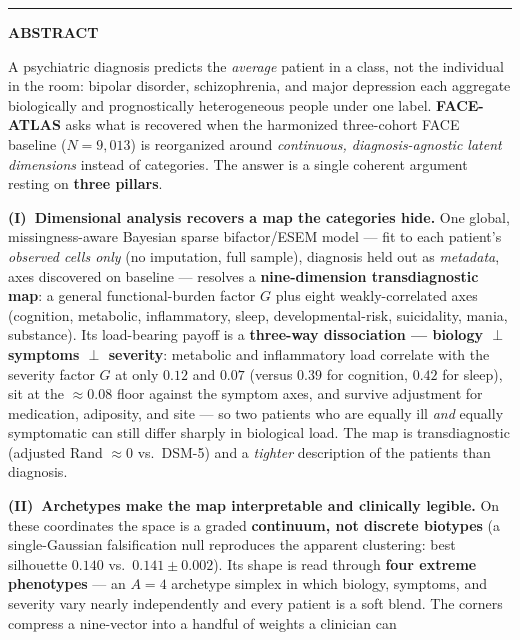 \documentclass[11pt]{article}
\begin{document}
\begin{titlepage}
{\color{facerule}\rule{\linewidth}{0.6pt}}\par\vspace{7pt}
{\sffamily\bfseries\color{faceaccent}\small ABSTRACT}\par\vspace{5pt}
{\small
A psychiatric diagnosis predicts the \emph{average} patient in a class, not the individual in the room: bipolar
disorder, schizophrenia, and major depression each aggregate biologically and prognostically heterogeneous
people under one label. \textbf{FACE-ATLAS} asks what is recovered when the harmonized three-cohort FACE
baseline ($N=9{,}013$) is reorganized around \emph{continuous, diagnosis-agnostic latent dimensions} instead of
categories. The answer is a single coherent argument resting on \textbf{three pillars}.\par\vspace{4pt}
\textbf{(I)~Dimensional analysis recovers a map the categories hide.} One global, missingness-aware Bayesian
sparse bifactor/ESEM model --- fit to each patient's \emph{observed cells only} (no imputation, full sample),
diagnosis held out as \emph{metadata}, axes discovered on baseline --- resolves a \textbf{nine-dimension
transdiagnostic map}: a general functional-burden factor $G$ plus eight weakly-correlated axes (cognition,
metabolic, inflammatory, sleep, developmental-risk, suicidality, mania, substance). Its load-bearing payoff is
a \textbf{three-way dissociation --- biology $\perp$ symptoms $\perp$ severity}: metabolic and inflammatory load
correlate with the severity factor $G$ at only $0.12$ and $0.07$ (versus $0.39$ for cognition, $0.42$ for
sleep), sit at the $\approx 0.08$ floor against the symptom axes, and survive adjustment for medication,
adiposity, and site --- so two patients who are equally ill \emph{and} equally symptomatic can still differ
sharply in biological load. The map is transdiagnostic (adjusted Rand $\approx 0$ vs.\ DSM-5) and a
\emph{tighter} description of the patients than diagnosis.\par\vspace{4pt}
\textbf{(II)~Archetypes make the map interpretable and clinically legible.} On these coordinates the space is a
graded \textbf{continuum, not discrete biotypes} (a single-Gaussian falsification null reproduces the apparent
clustering: best silhouette $0.140$ vs.\ $0.141\pm0.002$). Its shape is read through \textbf{four extreme
phenotypes} --- an $A{=}4$ archetype simplex in which biology, symptoms, and severity vary nearly independently
and every patient is a soft blend. The corners compress a nine-vector into a handful of weights a clinician can
}
\end{titlepage}
\end{document}
